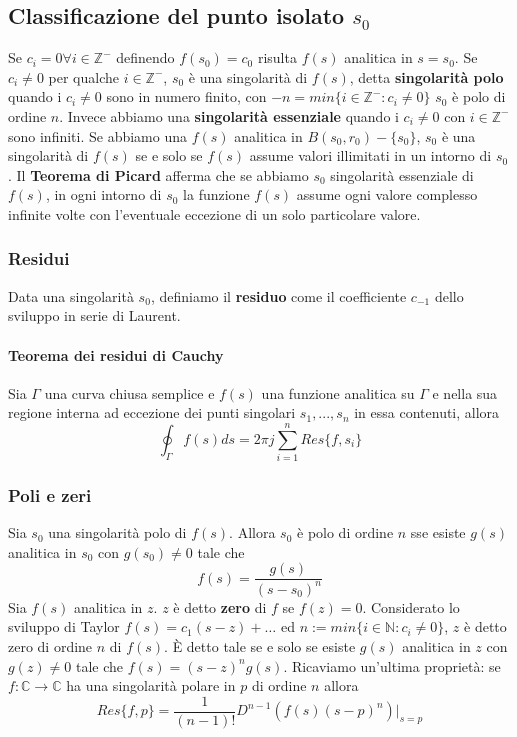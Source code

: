 \documentclass[11pt]{article}
\begin{document}
\subsection{Classificazione del punto isolato $s_0$}
Se $c_i =0 \forall i \in \mathbb{Z}^-$ definendo $f(s_0) = c_0$ risulta $f(s)$ analitica in $s=s_0$. Se $c_i \neq 0$ per qualche $i \in \mathbb{Z}^-$, $s_0$ è una singolarità di $f(s)$, detta \textbf{singolarità polo} quando i $c_i \neq 0$ sono in numero finito, con $-n = min\{i\in \mathbb{Z}^-: c_i \neq 0\}$ $s_0$ è polo di ordine $n$. Invece abbiamo una \textbf{singolarità essenziale} quando i $c_i \neq 0$ con $i \in \mathbb{Z}^-$ sono infiniti. Se abbiamo una $f(s)$ analitica in $B(s_0, r_0) - \{s_0\}$, $s_0$ è una singolarità di $f(s)$ se e solo se $f(s)$ assume valori illimitati in un intorno di $s_0$. 
Il \textbf{Teorema di Picard} afferma che se abbiamo $s_0$ singolarità essenziale di $f(s)$, in ogni intorno di $s_0$ la funzione $f(s)$ assume ogni valore complesso infinite volte con l'eventuale eccezione di un solo particolare valore. 
\subsubsection{Residui}
Data una singolarità $s_0$, definiamo il \textbf{residuo} come il coefficiente $c_{-1}$ dello sviluppo in serie di Laurent.
\paragraph{Teorema dei residui di Cauchy}
Sia $\Gamma$ una curva chiusa semplice e $f(s)$ una funzione analitica su $\Gamma$ e nella sua regione interna ad eccezione dei punti singolari $s_1,...,s_n$ in essa contenuti, allora 
\begin{displaymath}
    \oint_\Gamma f(s) ds = 2\pi j \sum_{i=1}^n Res\{f, s_i\}
\end{displaymath}
\subsubsection{Poli e zeri}
Sia $s_0$ una singolarità polo di $f(s)$. Allora $s_0$ è polo di ordine $n$ sse esiste $g(s)$ analitica in $s_0$ con $g(s_0) \neq 0$ tale che 
\begin{displaymath}
    f(s) = \frac{g(s)}{(s-s_0)^n}
\end{displaymath}
Sia $f(s)$ analitica in $z$. $z$ è detto \textbf{zero} di $f$ se $f(z)=0$. Considerato lo sviluppo di Taylor $f(s)= c_1(s-z)+\dots$ ed $n:=min\{i \in \mathbb{N}: c_i \neq 0\}$, $z$ è detto zero di ordine $n$ di $f(s)$. È detto tale se e solo se esiste $g(s)$ analitica in $z$ con $g(z) \neq 0$ tale che $f(s) = (s-z)^n g(s)$. Ricaviamo un'ultima proprietà: se $f: \mathbb{C} \rightarrow \mathbb{C}$ ha una singolarità polare in $p$ di ordine $n$ allora 
\begin{displaymath}
    Res\{f,p\} = \frac{1}{(n-1)!} D^{n-1} \left(f(s)(s-p)^n\right)|_{s=p}
\end{displaymath}
\end{document}
